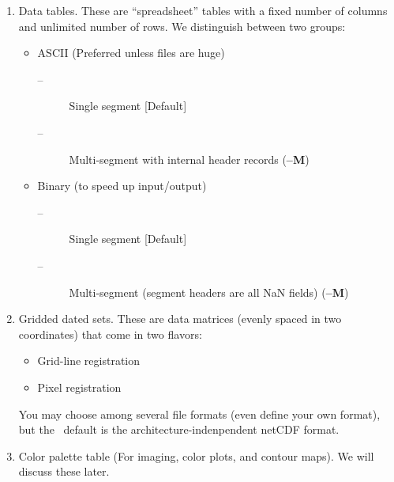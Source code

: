 \documentclass{report}
\begin{document}
\begin{enumerate}

\item Data tables.
These are ``spreadsheet'' tables with a fixed number of columns and
unlimited number of rows.  We distinguish between two groups:

\begin{itemize}

\item ASCII (Preferred unless files are huge)

\begin{description}

\item [--] Single segment [Default]

\item [--] Multi-segment with internal header records ({\bf --M})
\end{description}

\item Binary (to speed up input/output)

\begin{description}

\item [--] Single segment [Default]

\item [--] Multi-segment (segment headers are all NaN fields) ({\bf --M})
\end{description}

\end{itemize}

\item Gridded dated sets.
These are data matrices (evenly spaced in two coordinates) that come
in two flavors:

\begin{itemize}

\item Grid-line registration

\item Pixel registration

\end{itemize}

You may choose among several file formats (even define your own format),
but the \GMT\ default is the architecture-indenpendent netCDF format.

\item Color palette table (For imaging, color plots, and contour maps).
We will discuss these later.

\end{enumerate}
\end{document}
